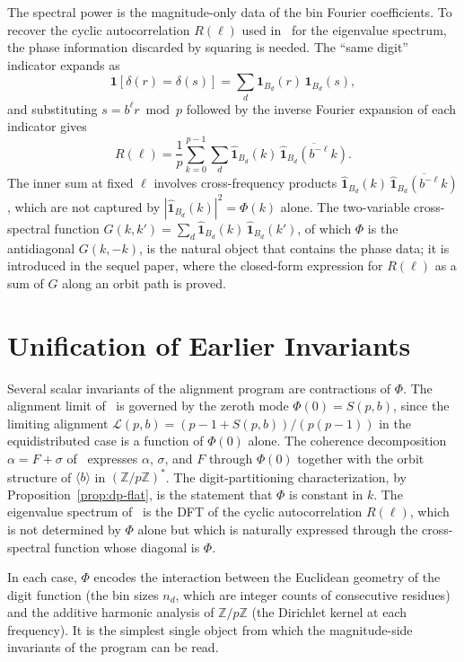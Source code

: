\documentclass[12pt]{amsart}
\theoremstyle{definition}
\theoremstyle{remark}
\begin{document}
The spectral power is the magnitude-only data of the bin
Fourier coefficients. To recover the cyclic autocorrelation
$R(\ell)$ used in~\cite{paper7} for the eigenvalue spectrum,
the phase information discarded by squaring is needed. The
``same digit'' indicator expands as
\[
\mathbf{1}[\delta(r) = \delta(s)]
= \sum_d \mathbf{1}_{B_d}(r)\, \mathbf{1}_{B_d}(s),
\]
and substituting $s = b^{\ell} r \bmod p$ followed by the
inverse Fourier expansion of each indicator gives
\[
R(\ell) = \frac{1}{p}
\sum_{k=0}^{p-1}
\sum_d \widehat{\mathbf{1}}_{B_d}(k)\,
\overline{\widehat{\mathbf{1}}_{B_d}(b^{-\ell}k)}.
\]
The inner sum at fixed $\ell$ involves cross-frequency
products
$\widehat{\mathbf{1}}_{B_d}(k)\,
\overline{\widehat{\mathbf{1}}_{B_d}(b^{-\ell}k)}$,
which are not captured by $|\widehat{\mathbf{1}}_{B_d}(k)|^2
= \Phi(k)$ alone. The two-variable cross-spectral function
$G(k,k') = \sum_d \widehat{\mathbf{1}}_{B_d}(k)\,
\widehat{\mathbf{1}}_{B_d}(k')$, of which $\Phi$ is the
antidiagonal $G(k,-k)$, is the natural object that
contains the phase data; it is introduced in the
sequel paper, where the closed-form expression for
$R(\ell)$ as a sum of $G$ along an orbit path is
proved.

\section{Unification of Earlier Invariants}

Several scalar invariants of the alignment program are
contractions of $\Phi$. The alignment limit
of~\cite{paper3} is governed by the zeroth mode
$\Phi(0) = S(p,b)$, since the limiting alignment
$\mathcal{L}(p,b) = (p - 1 + S(p,b))/(p(p-1))$ in the
equidistributed case is a function of $\Phi(0)$ alone.
The coherence decomposition $\alpha = F + \sigma$
of~\cite{paper5} expresses $\alpha$, $\sigma$, and $F$
through $\Phi(0)$ together with the orbit structure of
$\langle b \rangle$ in $(\mathbb{Z}/p\mathbb{Z})^*$. The
digit-partitioning characterization, by
Proposition~\ref{prop:dp-flat}, is the statement that
$\Phi$ is constant in $k$. The eigenvalue spectrum
of~\cite{paper7} is the DFT of the cyclic autocorrelation
$R(\ell)$, which is not determined by $\Phi$ alone but
which is naturally expressed through the cross-spectral
function whose diagonal is $\Phi$.

In each case, $\Phi$ encodes the interaction between the
Euclidean geometry of the digit function (the bin sizes
$n_d$, which are integer counts of consecutive residues)
and the additive harmonic analysis of
$\mathbb{Z}/p\mathbb{Z}$ (the Dirichlet kernel at each
frequency). It is the simplest single object from which
the magnitude-side invariants of the program can be
read.
\end{document}
